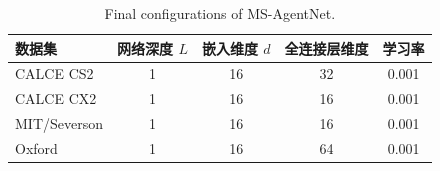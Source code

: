\begin{table}
\TableStyle
\caption{Final configurations of MS-AgentNet.}
\label{tab:4-2}
\begin{tabularx}{\linewidth}{@{\extracolsep{\fill}}L{1.25}C{0.85}C{0.95}C{1.10}C{0.85}@{}}
\toprule
数据集 & 网络深度 $L$ & 嵌入维度 $d$ & 全连接层维度 & 学习率 \\
\midrule
CALCE CS2 & 1 & 16 & 32 & 0.001 \\
CALCE CX2 & 1 & 16 & 16 & 0.001 \\
MIT/Severson & 1 & 16 & 16 & 0.001 \\
Oxford & 1 & 16 & 64 & 0.001 \\
\bottomrule
\end{tabularx}
\end{table}
